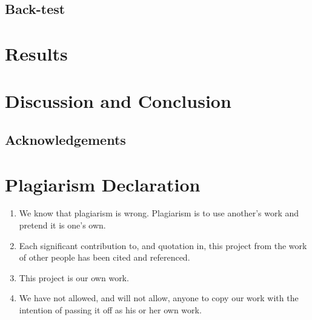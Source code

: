 \documentclass[12pt,a4paper]{article}
\newcommand{\be}{\begin{enumerate}}
\newcommand{\ee}{\end{enumerate}}
\begin{document}
\subsection{Back-test}
\label{subsec:BackTest}

\section{Results}
\label{sec:Results}

\section{Discussion and Conclusion}
\label{sec:Concl}

\newpage



\begin{center}
\section*{Acknowledgements} %
\label{sec:Acknow}
\end{center}

\newpage


\newpage


\label{bib:bibliography}

\newpage

\section*{Plagiarism Declaration}
\label{sec:Plagiarism}

\be
\item We know that plagiarism is wrong. Plagiarism is to use another's work and
pretend it is one's own.\\
\item Each significant contribution to, and quotation in, this project from the
work of other people has been cited and referenced.\\
\item This project is our own work.\\
\item We have not allowed, and will not allow, anyone to copy our work with the
intention of passing it off as his or her own work.\\
\ee
\end{document}
